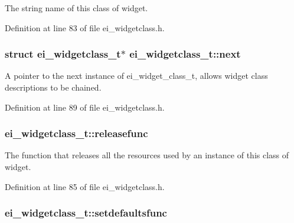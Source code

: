 The string name of this class of widget. 



Definition at line 83 of file ei\-\_\-widgetclass.\-h.

\hypertarget{structei__widgetclass__t_aa184e650475ec2451f033858db1876f0}{
\subsubsection[{next}]{\setlength{\rightskip}{0pt plus 5cm}struct {\bf ei\-\_\-widgetclass\-\_\-t}$\ast$ ei\-\_\-widgetclass\-\_\-t\-::next}}\label{structei__widgetclass__t_aa184e650475ec2451f033858db1876f0}


A pointer to the next instance of ei\-\_\-widget\-\_\-class\-\_\-t, allows widget class descriptions to be chained. 



Definition at line 89 of file ei\-\_\-widgetclass.\-h.

\hypertarget{structei__widgetclass__t_aebe6139b31816495e866c99ec3e83de6}{
\subsubsection[{releasefunc}]{ ei\-\_\-widgetclass\-\_\-t\-::releasefunc}}\label{structei__widgetclass__t_aebe6139b31816495e866c99ec3e83de6}


The function that releases all the resources used by an instance of this class of widget. 



Definition at line 85 of file ei\-\_\-widgetclass.\-h.

\hypertarget{structei__widgetclass__t_a5fec706eefca10172d897cf61b268510}{
\subsubsection[{setdefaultsfunc}]{ ei\-\_\-widgetclass\-\_\-t\-::setdefaultsfunc}}\label{structei__widgetclass__t_a5fec706eefca10172d897cf61b268510}


